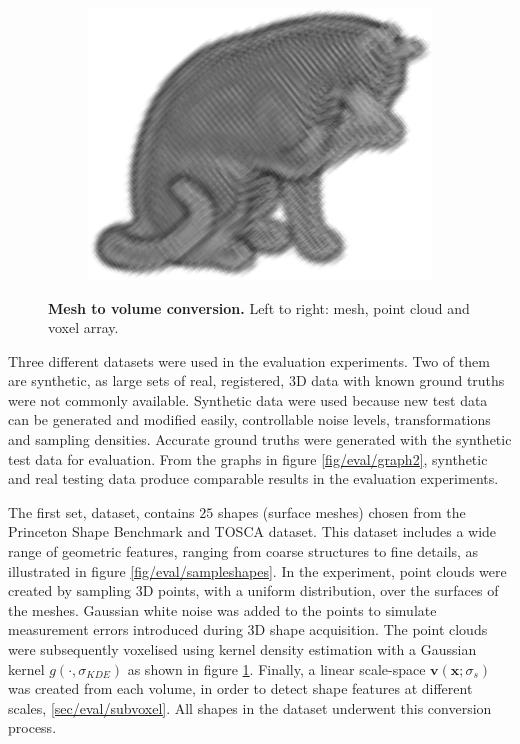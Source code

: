 \begin{figure}[ht]
	\begin{subfigure}[t]{0.31\linewidth} \centering 
		\includegraphics[height=0.85\linewidth]{./fig/eval/cat_volume.png}
	\end{subfigure}
	\caption{\textbf{Mesh to volume conversion.} Left to right: mesh, point cloud and voxel array.} 
	\label{fig/eval/vol_conversion}
\end{figure}

Three different datasets were used in the evaluation experiments. Two of them are synthetic, as large sets of real, registered, 3D data with known ground truths were not commonly available. Synthetic data were used because new test data can be generated and modified easily, \eg controllable noise levels, transformations and sampling densities. Accurate ground truths were generated with the synthetic test data for evaluation.  
From the graphs in figure \ref{fig/eval/graph2}, synthetic and real testing data produce comparable results in the evaluation experiments. 

The first set, \meshset dataset, contains $25$ shapes (surface meshes) chosen from the Princeton Shape Benchmark \cite{Shilane2004} and TOSCA \cite{Bronstein2008} dataset. 
This dataset includes a wide range of geometric features, ranging from coarse structures to fine details, as illustrated in figure \ref{fig/eval/sampleshapes}. In the experiment, point clouds were created by sampling 3D points, with a uniform distribution, over the surfaces of the meshes. Gaussian white noise was added to the points to simulate measurement errors introduced during 3D shape acquisition. 
The point clouds were subsequently voxelised using kernel density estimation with a Gaussian kernel $g(\cdot,\sigma_{KDE})$ as shown in figure \ref{fig/eval/vol_conversion}.
Finally, a linear scale-space $\mathbf{v}(\mathbf{x};\sigma_s)$ was created from each volume, in order to detect shape features at different scales, \cf \ref{sec/eval/subvoxel}. All shapes in the dataset underwent this conversion process. 

